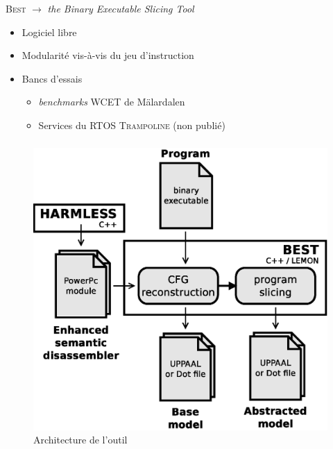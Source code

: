 \documentclass{beamer}
\begin{document}
  \begin{frame}
    \frametitle{\secname}
    
    \begin{block}{\textsc{Best}}
      $\rightarrow$ \emph{the Binary Executable Slicing Tool}
      \begin{itemize}
        \item Logiciel libre\footnotemark[1]
        \item Modularité vis-à-vis du jeu d'instruction
          \vspace{1em}
        \item Bancs d'essais
          \begin{itemize}
            \item \emph{benchmarks} WCET de Mälardalen
            \item Services du RTOS \textsc{Trampoline} (non publié)
          \end{itemize}
      \end{itemize}
    \end{block}

  \end{frame}
    
  \begin{frame}
    \frametitle{\secname}
    
    \begin{figure}
      \centering
      \includegraphics[scale=.4]{img/archi.eps}
      \caption{Architecture de l'outil}
    \end{figure}
  \end{frame}
\end{document}
